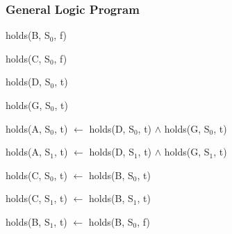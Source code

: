 \documentclass[a4paper]{article}
\begin{document}
      \subsubsection{General Logic Program}

        \begin{list}{}{Initial State}
          \item holds(B, S$_{0}$, f)
          \item holds(C, S$_{0}$, f)
          \item holds(D, S$_{0}$, t)
          \item holds(G, S$_{0}$, t)
        \end{list}

        \begin{list}{}{Inheritance Rules}
          \item 
            holds(A, S$_{0}$, t) $\leftarrow$ holds(D, S$_{0}$, t) $\land$ 
            holds(G, S$_{0}$, t)
          \item
            holds(A, S$_{1}$, t) $\leftarrow$ holds(D, S$_{1}$, t) $\land$ 
            holds(G, S$_{1}$, t)
        \end{list}

        \begin{list}{}{Constraint}
          \item holds(C, S$_{0}$, t) $\leftarrow$ holds(B, S$_{0}$, t)
          \item holds(C, S$_{1}$, t) $\leftarrow$ holds(B, S$_{1}$, t)
        \end{list}

        \begin{list}{}{Transformation}
          \item holds(B, S$_{1}$, t) $\leftarrow$ holds(B, S$_{0}$, f)
        \end{list}
\end{document}

